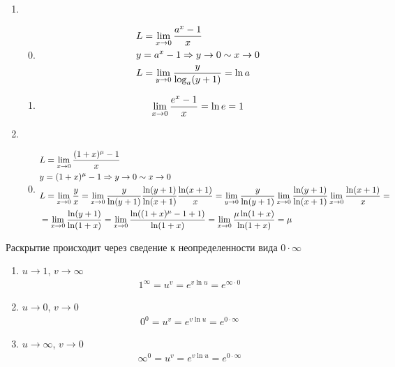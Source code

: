 \documentclass{article}
\begin{document}
\begin{enumerate}
	\item{}
	\begin{enumerate}[label=\theenumi.\arabic*.]
		\setcounter{enumii}{-1}
		\item{}
		\begin{align*}
			 & L=\lim\limits_{x\to 0}\frac{a^{x}-1}{x}             \\
			 & y=a^{x}-1\Rightarrow y\to 0\sim x\to 0             \\
			 & L=\lim\limits_{y\to 0}\frac{y}{\log_{a}(y+1)}=\ln a
		\end{align*}
		\item{}
		\begin{align*}
			\lim\limits_{x\to 0}\frac{e^{x}-1}{x}=\ln e=1
		\end{align*}
	\end{enumerate}

	\item{}
	\begin{enumerate}[label=\theenumi.\arabic*.]
		\setcounter{enumii}{-1}
		\item{}
		\begin{align*}
			 & L=\lim\limits_{x\to 0}\frac{(1+x)^{\mu}-1}{x}                                                                \\
			 & y=(1+x)^{\mu}-1\Rightarrow y\to 0\sim x\to 0                                                                \\
			 & L=\lim\limits_{x\to 0}\frac{y}{x}=\lim\limits_{x\to 0}\frac{y}{\ln(y+1)}\frac{\ln(y+1)}{\ln(x+1)}\frac{\ln(x+1)}{x}
			=\lim\limits_{y\to 0}\frac{y}{\ln(y+1)}\lim\limits_{x\to 0}\frac{\ln(y+1)}{\ln(x+1)}\lim\limits_{x\to 0}\frac{\ln(x+1)}{x}=   \\
			 & =\lim\limits_{x\to 0}\frac{\ln(y+1)}{\ln(1+x)}=\lim\limits_{x\to 0}\frac{\ln((1+x)^{\mu}-1+1)}{\ln(1+x)}
			=\lim\limits_{x\to 0}\frac{\mu\ln(1+x)}{\ln(1+x)}=\mu
		\end{align*}
	\end{enumerate}
\end{enumerate}

\pagebreak


Раскрытие происходит через сведение к неопределенности вида $0\cdot\infty$
\begin{enumerate}
	\item{}$u\to 1$, $v\to \infty$
	\begin{align*}
		1^{\infty}=u^{v}=e^{v\ln u}=e^{\infty\cdot 0}
	\end{align*}
	\item{}$u\to 0$, $v\to 0$
	\begin{align*}
		0^{0}=u^{v}=e^{v\ln u}=e^{0\cdot\infty}
	\end{align*}
	\item{}$u\to\infty$, $v\to 0$
	\begin{align*}
		\infty^{0}=u^{v}=e^{v\ln u}=e^{0\cdot\infty}
	\end{align*}
\end{enumerate}
\end{document}
